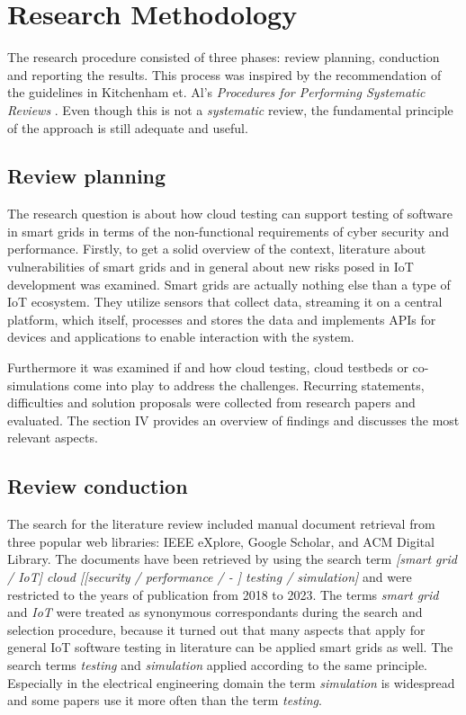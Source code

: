 \section{Research Methodology}
The research procedure consisted of three phases: review planning, conduction and reporting the results. This process was inspired by the recommendation of the guidelines in Kitchenham et. Al's \textit{Procedures for Performing Systematic Reviews} \cite{kitchenham2004procedures}. Even though this is not a \textit{systematic} review, the fundamental principle of the approach is still adequate and useful.

\subsection{Review planning}
The research question is about how cloud testing can support testing of software in smart grids in terms of the non-functional requirements of cyber security and performance. Firstly, to get a solid overview of the context, literature about vulnerabilities of smart grids and in general about new risks posed in IoT development was examined. Smart grids are actually nothing else than a type of IoT ecosystem. They utilize sensors that collect data, streaming it on a central platform, which itself, processes and stores the data and implements APIs for devices and applications to enable interaction with the system. 

Furthermore it was examined if and how cloud testing, cloud testbeds or co-simulations come into play to address the challenges. Recurring statements, difficulties and solution proposals were collected from research papers and evaluated. The section IV provides an overview of findings and discusses the most relevant aspects. 

\subsection{Review conduction}

The search for the literature review included manual document retrieval from three popular web libraries: IEEE eXplore, Google Scholar, and ACM Digital Library. The documents have been retrieved by using the search term \textit{[smart grid / IoT] cloud [[security / performance / - ] testing / simulation]} and were restricted to the years of publication from 2018 to 2023. The terms \textit{smart grid} and \textit{IoT} were treated as synonymous correspondants during the search and selection procedure, because it turned out that many aspects that apply for general IoT software testing in literature can be applied smart grids as well. The search terms \textit{testing} and \textit{simulation} applied according to the same principle. Especially in the electrical engineering domain the term \textit{simulation} is widespread and some papers use it more often than the term \textit{testing}.

